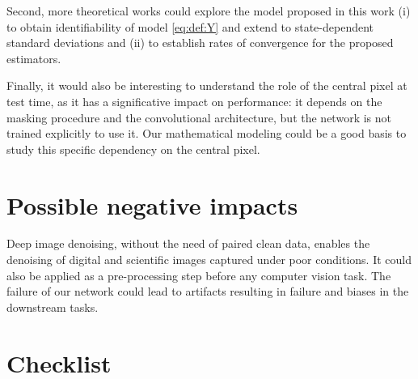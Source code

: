 \documentclass{article}
\begin{document}
Second, more theoretical works could explore the model proposed in this work  (i) to obtain identifiability of model \eqref{eq:def:Y} and extend \cite{gassiat:lecorff:lehericy:2021} to state-dependent standard deviations and (ii) to establish rates of convergence for the proposed estimators.

Finally, it would also be interesting to understand the role of the central pixel at test time, as it has a significative impact on performance: it depends on the  masking procedure and the convolutional architecture, but the network is not trained explicitly to use it. Our mathematical modeling could be a good basis to study this specific dependency on the central pixel.

\section{Possible negative impacts}
Deep image denoising, without the need of paired clean data, enables the denoising of digital and scientific
images captured under poor conditions. It could also be applied as a pre-processing step before any
computer vision task. The failure of our network could lead to artifacts resulting in failure and biases in the
downstream tasks.

\FloatBarrier
\pagebreak



%


\section*{Checklist}
\end{document}
